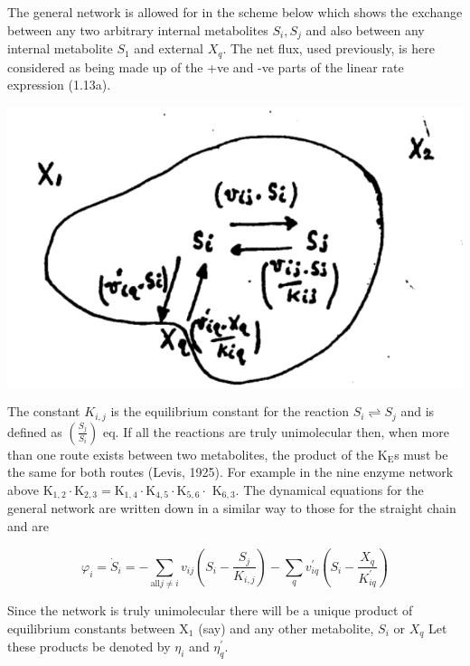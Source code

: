 The general network is allowed for in the scheme below which shows the exchange between any two arbitrary internal metabolites $S_i, S_j$ and also between any internal metabolite $S_1$ and external $X_q$. The net flux, used previously, is here considered as being made up of the +ve and -ve parts of the linear rate expression (1.13a).

\begin{center}
\includegraphics[scale=0.7]{figure1_system.png}
\end{center}

The constant $K_{i, j}$ is the equilibrium constant for the reaction $S_i \rightleftharpoons S_j$ and is defined as $\left(\frac{S_j}{S_i}\right)$ eq. If all the reactions are truly unimolecular then, when more than one route exists between two metabolites, the product of the $\mathrm{K}_{\mathrm{E}}$s must be the same for both routes (Levis, 1925). For example in the nine enzyme network above $\mathrm{K}_{1,2} \cdot \mathrm{K}_{2,3}=\mathrm{K}_{1,4} \cdot \mathrm{K}_{4,5} \cdot \mathrm{K}_{5,6} \cdot$ K$_{6,3}$. The dynamical equations for the general network are written down in a similar way to those for the straight chain and are

\begin{equation}
\varphi_i=\dot{S}_i=-\sum_{\mbox{all} j\neq i} v_{ij} \left(S_i-\frac{S_j}{K_{i,j}}\right)-\sum_q v_{iq}^{\prime}\left(S_i-\frac{X_q}{K_{iq}^{\prime}}\right)
\label{eqn:120}
\end{equation}

Since the network is truly unimolecular there will be a unique product of equilibrium constants between $\mathrm{X}_1$ (say) and any other metabolite, $S_i$ or $X_{q}$ Let these products be denoted by $\eta_i$ and $\eta^{\prime}_q$.


